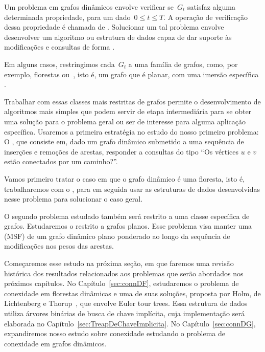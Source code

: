 Um problema em grafos dinâmicos envolve verificar se~$G_t$ satisfaz alguma determinada propriedade, para um dado~$0\leq t\leq T$.
A operação de verificação dessa propriedade é chamada de .
Solucionar um tal problema envolve desenvolver um algoritmo ou estrutura de dados capaz de dar suporte às modificações e consultas de forma .

Em alguns casos, restringimos cada~$G_t$ a uma família de grafos, como, por exemplo, florestas ou~, isto é, um grafo que é planar, com uma imersão específica .

Trabalhar com essas classes mais restritas de grafos permite o desenvolvimento de algoritmos mais simples que podem servir de etapa intermediária para se obter uma solução para o problema geral ou ser de interesse para alguma aplicação específica.
Usaremos a primeira estratégia no estudo do nosso primeiro problema:
O , que consiste em, dado um grafo dinâmico submetido a uma sequência de inserções e remoções de arestas, responder a consultas do tipo “Os vértices $u$ e $v$ estão conectados por um caminho?”.

Vamos primeiro tratar o caso em que o grafo dinâmico é uma floresta, isto é, trabalharemos com o ,
para em seguida usar as estruturas de dados desenvolvidas nesse problema para solucionar o caso geral.

O segundo problema estudado também será restrito a uma classe específica de grafos.
Estudaremos o  restrito a grafos planos.
Esse problema visa manter uma  (MSF) de um grafo dinâmico plano ponderado ao longo da sequência de modificações nos pesos das arestas.

Começaremos esse estudo na próxima seção, em que faremos uma revisão histórica dos resultados relacionados aos problemas que serão abordados nos próximos capítulos.
No Capítulo~\ref{sec:connDF}, estudaremos o problema de conexidade em florestas dinâmicas e uma de suas soluções, proposta por Holm, de Lichtenberg e Thorup~\cite{poly_log}, que envolve Euler tour trees.
Essa estrutura de dados utiliza árvores binárias de busca de chave implícita, cuja implementação será elaborada no Capítulo~\ref{sec:TreapDeChaveImplicita}.
No Capítulo~\ref{sec:connDG}, expandiremos nosso estudo sobre conexidade estudando o problema de conexidade em grafos dinâmicos.

